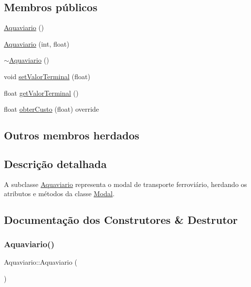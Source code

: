 \subsection*{Membros públicos}
\begin{DoxyCompactItemize}
\item 
\hyperlink{classAquaviario_a75a5b971394d2c3c74bc53293530d7c6}{Aquaviario} ()
\item 
\hyperlink{classAquaviario_a331abedc032bba3076427a3e555dc6fd}{Aquaviario} (int, float)
\item 
\hyperlink{classAquaviario_a71c1378131f32535dcad3e714e643c1d}{$\sim$\+Aquaviario} ()
\item 
void \hyperlink{classAquaviario_a9d2a7813c34be1532570788e15b1fd2a}{set\+Valor\+Terminal} (float)
\item 
float \hyperlink{classAquaviario_a74219219dcaf439a23c53a4c5eb1f151}{get\+Valor\+Terminal} ()
\item 
float \hyperlink{classAquaviario_a14803bda14b188a33a8f726d90171746}{obter\+Custo} (float) override
\end{DoxyCompactItemize}
\subsection*{Outros membros herdados}


\subsection{Descrição detalhada}
A subclasse \hyperlink{classAquaviario}{Aquaviario} representa o modal de transporte ferroviário, herdando os atributos e métodos da classe \hyperlink{classModal}{Modal}. 

\subsection{Documentação dos Construtores \& Destrutor}
\mbox{\label{classAquaviario_a75a5b971394d2c3c74bc53293530d7c6}} 
\subsubsection{\texorpdfstring{Aquaviario()}{Aquaviario()}\hspace{0.1cm}{\footnotesize\ttfamily [1/2]}}
{\footnotesize\ttfamily Aquaviario\+::\+Aquaviario (\begin{DoxyParamCaption}{ }\end{DoxyParamCaption})}

